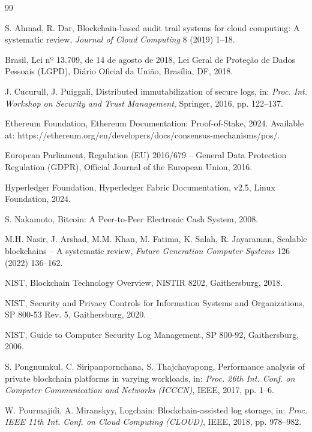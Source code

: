 \documentclass[12pt,a4paper]{article}
\begin{document}
\begin{thebibliography}{99}

S. Ahmad, R. Dar, Blockchain-based audit trail systems for cloud computing: A systematic review, \textit{Journal of Cloud Computing} 8 (2019) 1--18.

Brasil, Lei nº 13.709, de 14 de agosto de 2018, Lei Geral de Proteção de Dados Pessoais (LGPD), Diário Oficial da União, Brasília, DF, 2018.

J. Cucurull, J. Puiggalí, Distributed immutabilization of secure logs, in: \textit{Proc. Int. Workshop on Security and Trust Management}, Springer, 2016, pp. 122--137.

Ethereum Foundation, Ethereum Documentation: Proof-of-Stake, 2024. Available at: https://ethereum.org/en/developers/docs/consensus-mechanisms/pos/.

European Parliament, Regulation (EU) 2016/679 -- General Data Protection Regulation (GDPR), Official Journal of the European Union, 2016.

Hyperledger Foundation, Hyperledger Fabric Documentation, v2.5, Linux Foundation, 2024.

S. Nakamoto, Bitcoin: A Peer-to-Peer Electronic Cash System, 2008.

M.H. Nasir, J. Arshad, M.M. Khan, M. Fatima, K. Salah, R. Jayaraman, Scalable blockchains -- A systematic review, \textit{Future Generation Computer Systems} 126 (2022) 136--162.

NIST, Blockchain Technology Overview, NISTIR 8202, Gaithersburg, 2018.

NIST, Security and Privacy Controls for Information Systems and Organizations, SP 800-53 Rev. 5, Gaithersburg, 2020.

NIST, Guide to Computer Security Log Management, SP 800-92, Gaithersburg, 2006.

S. Pongnumkul, C. Siripanpornchana, S. Thajchayapong, Performance analysis of private blockchain platforms in varying workloads, in: \textit{Proc. 26th Int. Conf. on Computer Communication and Networks (ICCCN)}, IEEE, 2017, pp. 1--6.

W. Pourmajidi, A. Miranskyy, Logchain: Blockchain-assisted log storage, in: \textit{Proc. IEEE 11th Int. Conf. on Cloud Computing (CLOUD)}, IEEE, 2018, pp. 978--982.

\end{thebibliography}
\end{document}
